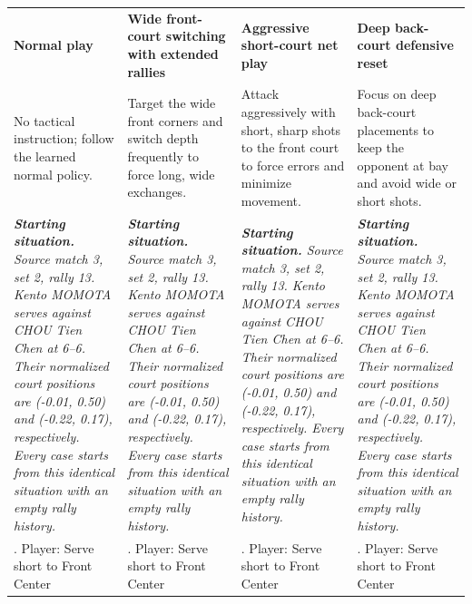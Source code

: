 \begin{table}[t]
\raggedright
\scriptsize
\renewcommand{\arraystretch}{1.05}
\begin{tabularx}{\textwidth}{*{4}{>{\raggedright\arraybackslash}X}}
\toprule
\textcolor{normalgray}{\textbf{\large Normal play}} & \textcolor{wideblue}{\textbf{\large Wide front-court switching with extended rallies}} & \textcolor{netgreen}{\textbf{\large Aggressive short-court net play}} & \textcolor{deeporange}{\textbf{\large Deep back-court defensive reset}} \\
\addlinespace[2pt]
No tactical instruction; follow the learned normal policy. & Target the wide front corners and switch depth frequently to force long, wide exchanges. & Attack aggressively with short, sharp shots to the front court to force errors and minimize movement. & Focus on deep back-court placements to keep the opponent at bay and avoid wide or short shots. \\
\addlinespace[2pt]
\textit{\textbf{Starting situation.} Source match 3, set 2, rally 13. Kento MOMOTA serves against CHOU Tien Chen at 6--6. Their normalized court positions are (-0.01, 0.50) and (-0.22, 0.17), respectively. Every case starts from this identical situation with an empty rally history.} & \textit{\textbf{Starting situation.} Source match 3, set 2, rally 13. Kento MOMOTA serves against CHOU Tien Chen at 6--6. Their normalized court positions are (-0.01, 0.50) and (-0.22, 0.17), respectively. Every case starts from this identical situation with an empty rally history.} & \textit{\textbf{Starting situation.} Source match 3, set 2, rally 13. Kento MOMOTA serves against CHOU Tien Chen at 6--6. Their normalized court positions are (-0.01, 0.50) and (-0.22, 0.17), respectively. Every case starts from this identical situation with an empty rally history.} & \textit{\textbf{Starting situation.} Source match 3, set 2, rally 13. Kento MOMOTA serves against CHOU Tien Chen at 6--6. Their normalized court positions are (-0.01, 0.50) and (-0.22, 0.17), respectively. Every case starts from this identical situation with an empty rally history.} \\
\midrule
1. Player: Serve short to Front Center & 1. Player: Serve short to Front Center & 1. Player: Serve short to Front Center & 1. Player: Serve short to Front Center \\

\end{tabularx}
\end{table}

